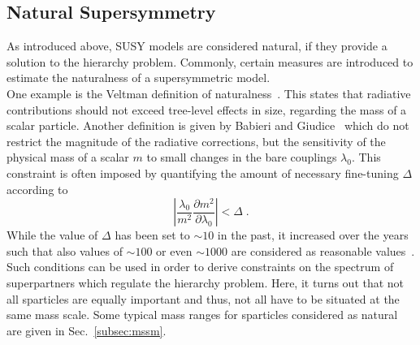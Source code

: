 \subsection{Natural Supersymmetry}
\label{subsec:natural_susy}
As introduced above, SUSY models are considered natural, if they provide a solution to the hierarchy problem. Commonly, certain measures are introduced to estimate the naturalness of a supersymmetric model. \\
One example is the Veltman definition of naturalness~\cite{veltman1981infrared}. This states that radiative contributions should not exceed tree-level effects in size, regarding the mass of a scalar particle. Another definition is given by Babieri and Giudice~\cite{Barbieri198863} which do not restrict the magnitude of the radiative corrections, but the sensitivity of the physical mass of a scalar $m$ to small changes in the bare couplings $\lambda_0$. This constraint is often imposed by quantifying the amount of necessary fine-tuning $\Delta$ according to
\begin{equation}
\left| \frac{\lambda_0}{m^2}\frac{\partial m^2}{\partial \lambda_0} \right| < \Delta \; .
\end{equation}
While the value of $\Delta$ has been set to $\sim10$ in the past, it increased over the years such that also values of $\sim100$ or even $\sim1000$ are considered as reasonable values~\cite{Craig:2013cxa}. \\
Such conditions can be used in order to derive constraints on the spectrum of superpartners which regulate the hierarchy problem. Here, it turns out that not all sparticles are equally important and thus, not all have to be situated at the same mass scale. Some typical mass ranges for sparticles considered as natural are given in Sec.~\ref{subsec:mssm}. 

